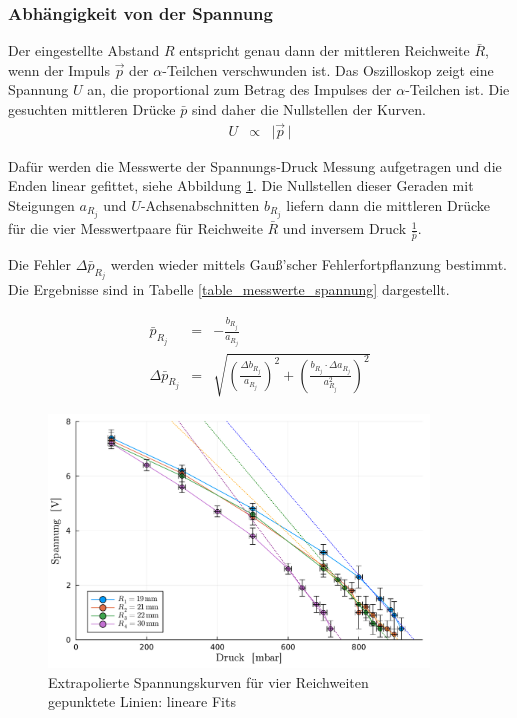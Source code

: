 \documentclass[12pt,a4paper]{scrartcl}
\numberwithin{equation}{section} %
\begin{document}
\hypertarget{bestimmung-durch-Spannung}{%
	\subsubsection{Abhängigkeit von der Spannung}\label{bestimmung-durch-Spannung}}

Der eingestellte Abstand $R$ entspricht genau dann der mittleren Reichweite $\bar{R}$, wenn der Impuls $\vec{p}$ der $\alpha$-Teilchen verschwunden ist. Das Oszilloskop zeigt eine Spannung $U$ an, die proportional zum Betrag des  Impulses der $\alpha$-Teilchen ist. Die gesuchten mittleren Drücke $\bar{p}$ sind daher die Nullstellen der Kurven.
\begin{eqnarray}
	U &\propto& \lvert \vec{p}\, \rvert
\end{eqnarray}

Dafür werden die Messwerte der Spannungs-Druck Messung aufgetragen und die Enden linear gefittet, siehe Abbildung \ref{fig:spannungskurveExtrapoliert}. Die Nullstellen dieser Geraden mit Steigungen $a_{R_j}$ und $U$-Achsenabschnitten $b_{R_j}$ liefern dann die mittleren Drücke für die vier Messwertpaare für Reichweite $\bar{R}$ und inversem Druck $\frac{1}{\bar{p}}$.

Die Fehler $\Delta  \bar p_{R_j}$ werden wieder mittels Gauß'scher Fehlerfortpflanzung bestimmt. Die Ergebnisse sind in Tabelle \ref{table_messwerte_spannung} dargestellt.

\begin{eqnarray}
\bar{p}_{R_j} &=& - \frac{b_{R_j}}{a_{R_j}} \\
	\Delta \bar{p}_{R_j} &=& \sqrt{\left(\frac{\Delta b_{R_j}}{a_{R_j}}\right)^2 + \left(\frac{b_{R_j} \cdot \Delta a_{R_j}}{a_{R_j}^2}\right)^2}
\end{eqnarray}

\begin{figure}[H]
	\centering
	\includegraphics[width=0.9\textwidth]{../media/B3.3/spannungskurven extrapoliert.pdf}
	\caption{Extrapolierte Spannungskurven für vier Reichweiten \\
		gepunktete Linien: lineare Fits}
	\label{fig:spannungskurveExtrapoliert}
\end{figure}
\end{document}
